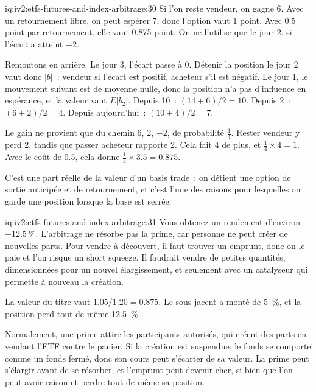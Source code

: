 \begin{solution}{iq:iv2:etfs-futures-and-index-arbitrage:30}
Si l'on reste vendeur, on gagne 6. Avec un retournement libre, on peut espérer 7, donc l'option vaut 1 point. Avec 0.5 point par retournement, elle vaut 0.875 point. On ne l'utilise que le jour 2, si l'écart a atteint $-2$.

Remontons en arrière. Le jour 3, l'écart passe à 0. Détenir la position le jour 2 vaut donc $|b|$~: vendeur si l'écart est positif, acheteur s'il est négatif. Le jour 1, le mouvement suivant est de moyenne nulle, donc la position n'a pas d'influence en espérance, et la valeur vaut $E|b_2|$. Depuis 10~: $(14 + 6)/2 = 10$. Depuis 2~: $(6 + 2)/2 = 4$. Depuis aujourd'hui~: $(10 + 4)/2 = 7$.

Le gain ne provient que du chemin 6, 2, $-2$, de probabilité $\tfrac14$. Rester vendeur y perd 2, tandis que passer acheteur rapporte 2. Cela fait 4 de plus, et $\tfrac14 \times 4 = 1$. Avec le coût de 0.5, cela donne $\tfrac14 \times 3.5 = 0.875$.

C'est une part réelle de la valeur d'un basis trade~: on détient une option de sortie anticipée et de retournement, et c'est l'une des raisons pour lesquelles on garde une position lorsque la base est serrée.

\end{solution}

\begin{solution}{iq:iv2:etfs-futures-and-index-arbitrage:31}
Vous obtenez un rendement d'environ $-12.5~\%$. L'arbitrage ne résorbe pas la prime, car personne ne peut créer de nouvelles parts. Pour vendre à découvert, il faut trouver un emprunt, donc on le paie et l'on risque un short squeeze. Il faudrait vendre de petites quantités, dimensionnées pour un nouvel élargissement, et seulement avec un catalyseur qui permette à nouveau la création.

La valeur du titre vaut $1.05/1.20 = 0.875$. Le sous-jacent a monté de 5~\%, et la position perd tout de même 12.5~\%.

Normalement, une prime attire les participants autorisés, qui créent des parts en vendant l'ETF contre le panier. Si la création est suspendue, le fonds se comporte comme un fonds fermé, donc son cours peut s'écarter de sa valeur. La prime peut s'élargir avant de se résorber, et l'emprunt peut devenir cher, si bien que l'on peut avoir raison et perdre tout de même sa position.

\end{solution}

